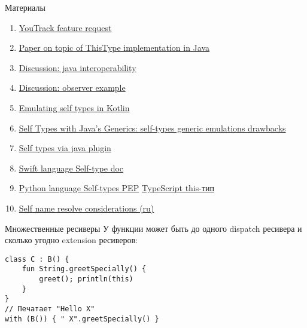 \documentclass[handout,aspectratio=169,usenames,dvipsnames]{beamer}
\begin{document}
\begin{frame}{Материалы}
    \begin{enumerate}
        \item \href{https://youtrack.jetbrains.com/issue/KT-6494}{\color{blue} YouTrack feature request}
        \item \href{https://dl.acm.org/doi/10.1145/2888392}{\color{blue} Paper on topic of ThisType implementation in Java}
        \item \href{https://discuss.kotlinlang.org/t/self-types/371}{\color{blue} Discussion: java interoperability}
        \item \href{https://discuss.kotlinlang.org/t/this-type/1421}{\color{blue} Discussion: observer example}
        \item \href{https://medium.com/@jerzy.chalupski/emulating-self-types-in-kotlin-d64fe8ea2e62}{\color{blue} Emulating self types in Kotlin}
        \item \href{https://www.sitepoint.com/self-types-with-javas-generics/}{\color{blue} Self Types with Java’s Generics: self-types generic emulations drawbacks}
        \item \href{https://github.com/manifold-systems/manifold}{\color{blue} Self types via java plugin}
        \item \href{https://docs.swift.org/swift-book/documentation/the-swift-programming-language/types/\#Self-Type}{\color{blue} Swift language Self-type doc}
        \item \href{https://peps.python.org/pep-0673/}{\color{blue} Python language Self-types PEP}
        \href{https://www.typescriptlang.org/docs/handbook/2/classes.html\#this-types}{\color{blue}TypeScript this-тип}
        \item \href{https://maximgran.notion.site/maximgran/Self-types-58e89d6dda374ba9abb4483b192a49c2}{\color{blue} Self name resolve considerations (ru)}
    \end{enumerate}
\end{frame}

\begin{frame}[fragile]{Множественные ресиверы}
   У функции может быть до одного dispatch ресивера и сколько угодно extension ресиверов:
   \begin{verbatim}
class C : B() {
    fun String.greetSpecially() {
        greet(); println(this)
    }
}
// Печатает "Hello X"
with (B()) { " X".greetSpecially() }
   \end{verbatim}
\end{frame}
\end{document}
